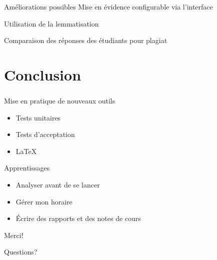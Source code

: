 \documentclass{beamer}
\begin{document}
  \begin{frame}
    \frametitle{\insertsection}
    \begin{block}{Am\'eliorations possibles}
      Mise en \'evidence configurable via l'interface

      \medskip
  
      Utilisation de la lemmatisation
  
      \medskip
  
      Comparaison des r\'eponses des \'etudiants pour plagiat
    \end{block}
  \end{frame}
  
  \section[Conclusion]{Conclusion}
  \begin{frame}
  \frametitle{\insertsection}
  \begin{block}{Mise en pratique de nouveaux outils}
  \begin{itemize}
    \item Tests unitaires
    \item Tests d'acceptation
    \item \LaTeX
  \end{itemize}
  \end{block}

  \vfill
  
  \begin{block}{Apprentissages}
  \begin{itemize}
    \item Analyser avant de se lancer
    \item G\'erer mon horaire
    \item \'Ecrire des rapports et des notes de cours
  \end{itemize}
  \end{block}
  \vfill
  \end{frame}
  
  \begin{frame}
  \begin{center}
  \Huge Merci!
  \end{center}

  \vfill

  \begin{center}
  \Huge Questions?
  \end{center}
  \vfill
  \end{frame}
\end{document}
